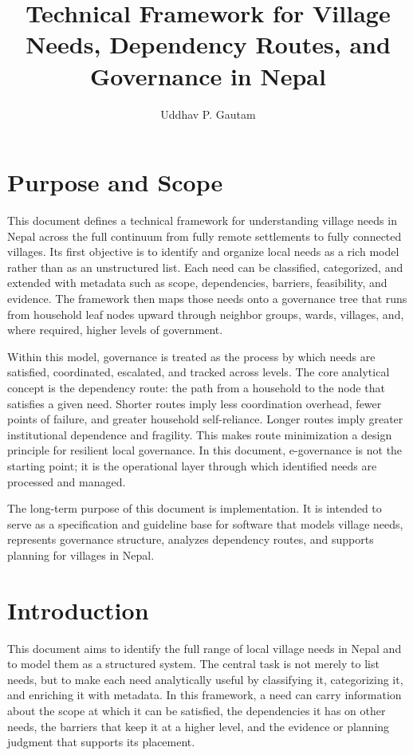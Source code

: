 \documentclass[11pt,a4paper]{article}
\title{Technical Framework for Village Needs, Dependency Routes, and Governance in Nepal}
\author{Uddhav P. Gautam}
\date{}
\begin{document}
\maketitle

\section*{Purpose and Scope}

This document defines a technical framework for understanding village needs in Nepal across the full continuum from fully remote settlements to fully connected villages. Its first objective is to identify and organize local needs as a rich model rather than as an unstructured list. Each need can be classified, categorized, and extended with metadata such as scope, dependencies, barriers, feasibility, and evidence. The framework then maps those needs onto a governance tree that runs from household leaf nodes upward through neighbor groups, wards, villages, and, where required, higher levels of government.

Within this model, governance is treated as the process by which needs are satisfied, coordinated, escalated, and tracked across levels. The core analytical concept is the dependency route: the path from a household to the node that satisfies a given need. Shorter routes imply less coordination overhead, fewer points of failure, and greater household self-reliance. Longer routes imply greater institutional dependence and fragility. This makes route minimization a design principle for resilient local governance. In this document, e-governance is not the starting point; it is the operational layer through which identified needs are processed and managed.

The long-term purpose of this document is implementation. It is intended to serve as a specification and guideline base for software that models village needs, represents governance structure, analyzes dependency routes, and supports planning for villages in Nepal.

\tableofcontents
\newpage

\section{Introduction}

This document aims to identify the full range of local village needs in Nepal and to model them as a structured system. The central task is not merely to list needs, but to make each need analytically useful by classifying it, categorizing it, and enriching it with metadata. In this framework, a need can carry information about the scope at which it can be satisfied, the dependencies it has on other needs, the barriers that keep it at a higher level, and the evidence or planning judgment that supports its placement.
\end{document}
